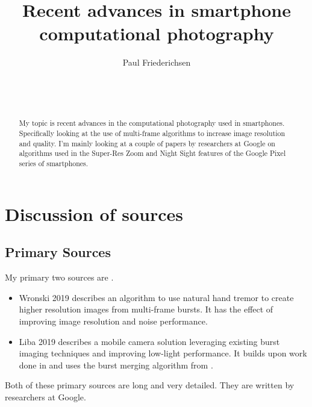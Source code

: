 \documentclass{sig-alternate}
\begin{document}

\title{Recent advances in smartphone computational photography}


\author{
\alignauthor
Paul Friederichsen\\
	\\
	\\
	\\
}

\maketitle

\begin{abstract}
My topic is recent advances in the computational photography used in smartphones. Specifically looking at the use of multi-frame algorithms to increase image resolution and quality. I'm mainly looking at a couple of papers by researchers at Google on algorithms used in the Super-Res Zoom and Night Sight features of the Google Pixel series of smartphones.
\end{abstract}

\section{Discussion of sources}


\subsection{Primary Sources}

My primary two sources are \cite{Wronski2019, Liba2019}.
\begin{itemize}
\item Wronski 2019 \cite{Wronski2019} describes an algorithm to use natural hand tremor to create higher resolution images from multi-frame bursts. It has the effect of improving image resolution and noise performance.

\item Liba 2019 \cite{Liba2019} describes a mobile camera solution leveraging existing burst imaging techniques and improving low-light performance. It builds upon work done in \cite{Hasinoff2016} and uses the burst merging algorithm from \cite{Wronski2019}.
\end{itemize}
Both of these primary sources are long and very detailed. They are written by researchers at Google.
\end{document}

